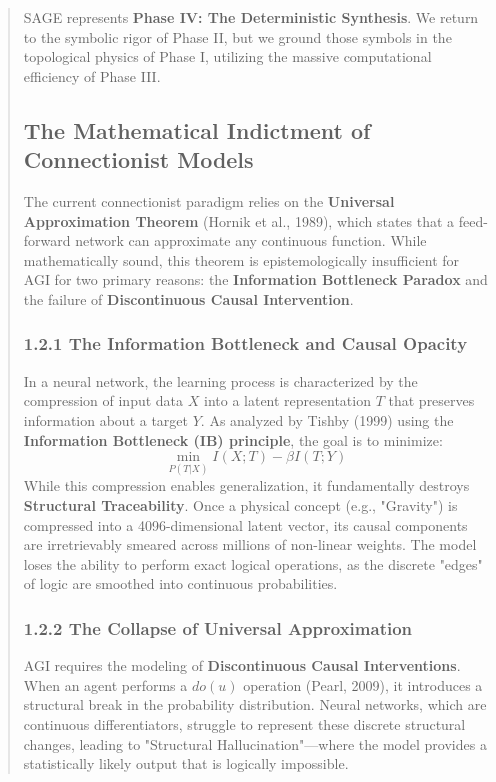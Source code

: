 \documentclass[10pt,twocolumn,letterpaper]{article}
\begin{document}
\begin{abstract}
SAGE represents \textbf{Phase IV: The Deterministic Synthesis}. We return to the symbolic rigor of Phase II, but we ground those symbols in the topological physics of Phase I, utilizing the massive computational efficiency of Phase III.

\subsection{The Mathematical Indictment of Connectionist Models}

The current connectionist paradigm relies on the \textbf{Universal Approximation Theorem} (Hornik et al., 1989), which states that a feed-forward network can approximate any continuous function. While mathematically sound, this theorem is epistemologically insufficient for AGI for two primary reasons: the \textbf{Information Bottleneck Paradox} and the failure of \textbf{Discontinuous Causal Intervention}.

\subsubsection{1.2.1 The Information Bottleneck and Causal Opacity}
In a neural network, the learning process is characterized by the compression of input data $X$ into a latent representation $T$ that preserves information about a target $Y$. As analyzed by Tishby (1999) using the \textbf{Information Bottleneck (IB) principle}, the goal is to minimize:
$$ \min_{P(T|X)} I(X; T) - \beta I(T; Y) $$
While this compression enables generalization, it fundamentally destroys \textbf{Structural Traceability}. Once a physical concept (e.g., "Gravity") is compressed into a 4096-dimensional latent vector, its causal components are irretrievably smeared across millions of non-linear weights. The model loses the ability to perform exact logical operations, as the discrete "edges" of logic are smoothed into continuous probabilities.

\subsubsection{1.2.2 The Collapse of Universal Approximation}
AGI requires the modeling of \textbf{Discontinuous Causal Interventions}. When an agent performs a $do(u)$ operation (Pearl, 2009), it introduces a structural break in the probability distribution. Neural networks, which are continuous differentiators, struggle to represent these discrete structural changes, leading to "Structural Hallucination"—where the model provides a statistically likely output that is logically impossible.


\end{abstract}
\end{document}
